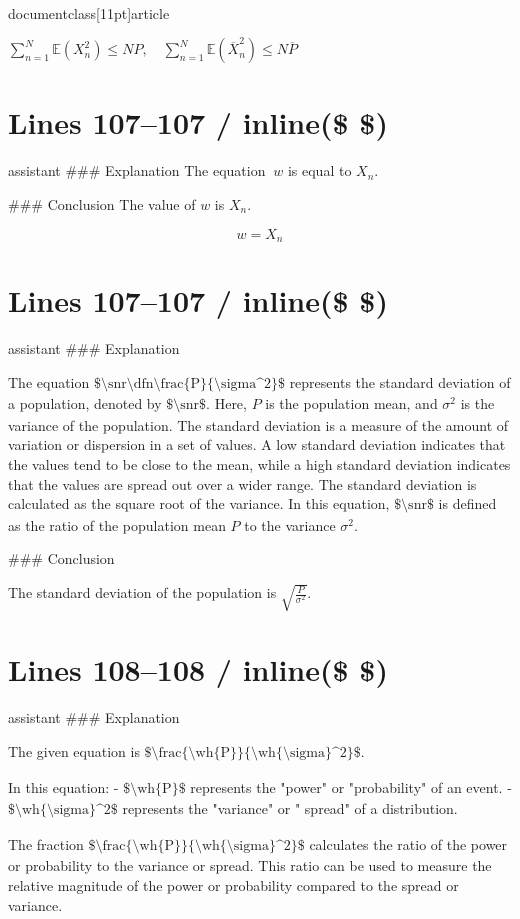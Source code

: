 \\documentclass[11pt]{article}
\begin{document}
\(\boxed{\sum_{n=1}^N\mathbb{E}(X_n^2) \leq N P, \quad \sum_{n=1}^N\mathbb{E}(\overline{X}_n^2) \leq N \overline{P}}\)


\section*{Lines 107–107 / inline(\$ \$) }
assistant
### Explanation
The equation \(\ w \) is equal to \( X_n \).

### Conclusion
The value of \( w \) is \( X_n \).

\[
\boxed{w = X_n}
\]


\section*{Lines 107–107 / inline(\$ \$) }
assistant
### Explanation

The equation \(\snr\dfn\frac{P}{\sigma^2}\) represents the standard deviation of a population, denoted by \(\snr\). Here, \(P\) is the population mean, and \(\sigma^2\) is the variance of the population. The standard deviation is a measure of the amount of variation or dispersion in a set of values. A low standard deviation indicates that the values tend to be close to the mean, while a high standard deviation indicates that the values are spread out over a wider range. The standard deviation is calculated as the square root of the variance. In this equation, \(\snr\) is defined as the ratio of the population mean \(P\) to the variance \(\sigma^2\).

### Conclusion

The standard deviation of the population is \(\boxed{\sqrt{\frac{P}{\sigma^2}}}\).


\section*{Lines 108–108 / inline(\$ \$) }
assistant
### Explanation

The given equation is \(\frac{\wh{P}}{\wh{\sigma}^2}\).

In this equation:
- \(\wh{P}\) represents the "power" or "probability" of an event.
- \(\wh{\sigma}^2\) represents the "variance" or " spread" of a distribution.

The fraction \(\frac{\wh{P}}{\wh{\sigma}^2}\) calculates the ratio of the power or probability to the variance or spread. This ratio can be used to measure the relative magnitude of the power or probability compared to the spread or variance.
\end{document}
